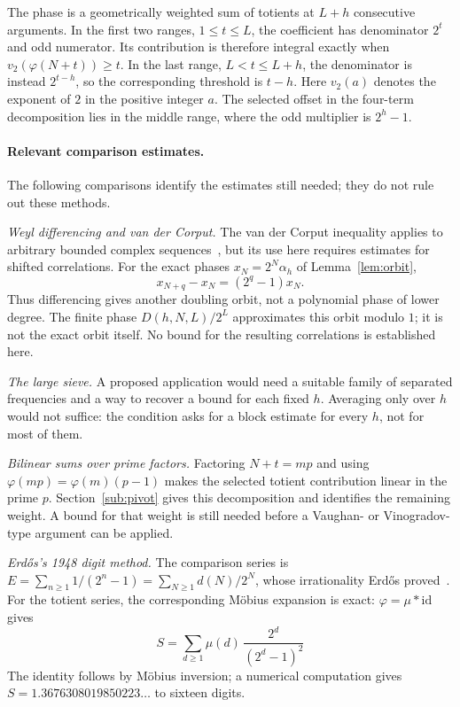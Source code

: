 The phase is a geometrically weighted sum of totients at $L+h$
consecutive arguments. In the first two ranges, $1\le t\le L$, the
coefficient has denominator $2^t$ and odd numerator. Its contribution is
therefore integral exactly when $v_2(\varphi(N+t))\ge t$. In the last range,
$L<t\le L+h$, the denominator is instead $2^{t-h}$, so the corresponding
threshold is $t-h$. Here $v_2(a)$ denotes the exponent of $2$ in the
positive integer $a$. The selected offset in the four-term decomposition
lies in the middle range, where the odd multiplier is $2^h-1$.

\paragraph{Relevant comparison estimates.}
The following comparisons identify the estimates still needed; they do
not rule out these methods.

\emph{Weyl differencing and van der Corput.} The van der Corput inequality
applies to arbitrary bounded complex sequences~\cite[Theorem~2.1]{edeko-vdc},
but its use here requires estimates for shifted correlations. For the exact
phases $x_N=2^N\alpha_h$ of Lemma~\ref{lem:orbit},
\[
 x_{N+q}-x_N=(2^q-1)x_N.
\]
Thus differencing gives another doubling orbit, not a polynomial phase of
lower degree. The finite phase $D(h,N,L)/2^L$ approximates this orbit modulo
$1$; it is not the exact orbit itself. No bound for the resulting
correlations is established here.

\emph{The large sieve.} A proposed application would need a suitable
family of separated frequencies and a way to recover a bound for each
fixed $h$. Averaging only over $h$ would not suffice: the condition asks
for a block estimate for every $h$, not for most of them.

\emph{Bilinear sums over prime factors.} Factoring $N+t=mp$ and using
$\varphi(mp)=\varphi(m)(p-1)$ makes the selected totient contribution linear
in the prime $p$. Section~\ref{sub:pivot} gives this decomposition and
identifies the remaining weight. A bound for that weight is still needed
before a Vaughan- or Vinogradov-type argument can be applied.

\emph{Erd\H{o}s's 1948 digit method.} The comparison series is
$E=\sum_{n\ge1}1/(2^n-1)=\sum_{N\ge1}d(N)/2^N$, whose irrationality
Erd\H{o}s proved~\cite{erdos1948lambert}. For the totient series, the
corresponding M\"obius expansion is exact: $\varphi=\mu * \mathrm{id}$ gives
\begin{equation}\label{eq:mobmers}
  S=\sum_{d\ge 1}\mu(d)\,\frac{2^{d}}{(2^{d}-1)^{2}}
\end{equation}
The identity follows by M\"obius inversion; a numerical computation gives
$S=1.3676308019850223\ldots$ to sixteen digits.

